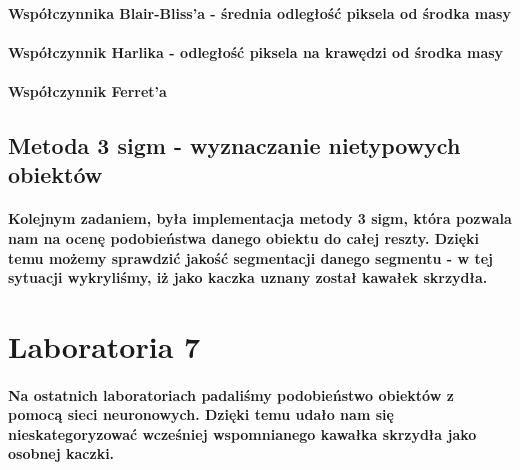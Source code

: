 \documentclass[a4paper,12pt]{article}
\begin{document}
\begin{justify}
\paragraph{Współczynnika Blair-Bliss'a - średnia odległość piksela od środka masy}

\paragraph{Współczynnik Harlika - odległość piksela na krawędzi od środka masy}

\paragraph{Współczynnik Ferret'a}

\subsection{Metoda 3 sigm - wyznaczanie nietypowych obiektów}

\paragraph{Kolejnym zadaniem, była implementacja metody 3 sigm, która pozwala nam na ocenę podobieństwa danego obiektu do całej reszty. Dzięki temu możemy sprawdzić jakość segmentacji danego segmentu - w tej sytuacji wykryliśmy, iż jako kaczka uznany został kawałek skrzydła.}

\newpage

\section{Laboratoria 7}

\paragraph{Na ostatnich laboratoriach padaliśmy podobieństwo obiektów z pomocą sieci neuronowych. Dzięki temu udało nam się nieskategoryzować wcześniej wspomnianego kawałka skrzydła jako osobnej kaczki.}


\end{justify}
\end{document}
